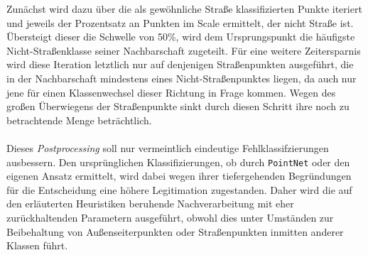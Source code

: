 Zunächst wird dazu über die als gewöhnliche Straße klassifizierten Punkte iteriert und jeweils der Prozentsatz an Punkten im Scale ermittelt, der nicht Straße ist. Übersteigt dieser die Schwelle von 50\%, wird dem Ursprungspunkt die häufigste Nicht-Straßenklasse seiner Nachbarschaft zugeteilt. Für eine weitere Zeitersparnis wird diese Iteration letztlich nur auf denjenigen Straßenpunkten ausgeführt, die in der Nachbarschaft mindestens eines Nicht-Straßenpunktes liegen, da auch nur jene für einen Klassenwechsel dieser Richtung in Frage kommen. Wegen des großen Überwiegens der Straßenpunkte sinkt durch diesen Schritt ihre noch zu betrachtende Menge beträchtlich. \\\\
Dieses \textit{Postprocessing} soll nur vermeintlich eindeutige Fehlklassifzierungen ausbessern. Den ursprünglichen Klassifizierungen, ob durch \texttt{PointNet} oder den eigenen Ansatz ermittelt, wird dabei wegen ihrer tiefergehenden Begründungen für die Entscheidung eine höhere Legitimation zugestanden. Daher wird die auf den erläuterten Heuristiken beruhende Nachverarbeitung mit eher zurückhaltenden Parametern ausgeführt, obwohl dies unter Umständen zur Beibehaltung von Außenseiterpunkten oder Straßenpunkten inmitten anderer Klassen führt.